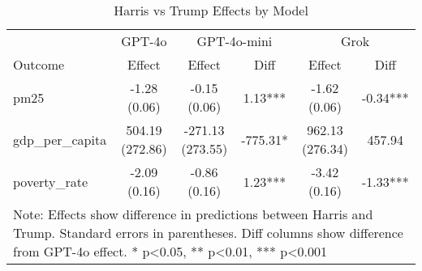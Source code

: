 \begin{table}[htbp]
    \centering
    \caption{Harris vs Trump Effects by Model}
    \begin{tabular}{lccccc}
    \hline
    & \multicolumn{1}{c}{GPT-4o} & \multicolumn{2}{c}{GPT-4o-mini} & \multicolumn{2}{c}{Grok} \\
    Outcome & Effect & Effect & Diff & Effect & Diff \\
    \hline
    pm25 & -1.28 (0.06) & -0.15 (0.06) & 1.13*** & -1.62 (0.06) & -0.34*** \\
gdp_per_capita & 504.19 (272.86) & -271.13 (273.55) & -775.31* & 962.13 (276.34) & 457.94 \\
poverty_rate & -2.09 (0.16) & -0.86 (0.16) & 1.23*** & -3.42 (0.16) & -1.33*** \\
\hline
    \multicolumn{6}{p{0.95\textwidth}}{\small Note: Effects show difference in predictions between Harris and Trump. 
    Standard errors in parentheses. Diff columns show difference from GPT-4o effect. * p<0.05, ** p<0.01, *** p<0.001} \\
    \end{tabular}
    \label{tab:model_comparison}
    \end{table}